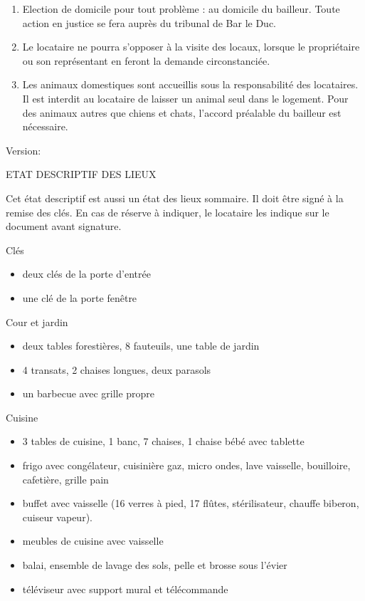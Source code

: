 \documentclass[a4paper,11pt]{article}
\begin{document}
\begin{enumerate}
\item Election de domicile pour tout problème : au domicile du bailleur. Toute action en justice se fera auprès du tribunal de Bar le Duc.

\item Le locataire ne pourra s’opposer à la visite des locaux, lorsque le propriétaire ou son représentant en feront la demande circonstanciée.

\item Les animaux domestiques sont accueillis sous la responsabilité des locataires. Il est interdit au locataire de laisser un animal seul dans le logement. Pour des animaux autres que chiens et chats, l'accord préalable du bailleur est nécessaire.

\end{enumerate}

\hspace{10cm}
Version: \date{\today}


\normalsize

\newpage{}

ETAT DESCRIPTIF DES LIEUX
 
Cet état descriptif est aussi un état des lieux sommaire. Il doit être signé à la remise des clés. En cas de réserve à indiquer, le locataire les indique sur le document avant signature.

\vspace{0.25cm}


Clés
\begin{itemize}
\item deux clés de la porte d'entrée
\item une clé de la porte fenêtre
\end{itemize}


\vspace{0.25cm}

Cour et jardin
\begin{itemize}
\item deux tables forestières, 8 fauteuils, une table de jardin
\item 4 transats, 2 chaises longues, deux parasols
\item un barbecue avec grille propre
\end{itemize}

\vspace{0.25cm}

Cuisine
\begin{itemize}
\item 3 tables de cuisine, 1 banc, 7 chaises, 1 chaise bébé avec tablette
\item frigo avec congélateur, cuisinière gaz, micro ondes, lave vaisselle, bouilloire, cafetière, grille pain
\item buffet avec vaisselle (16 verres à pied, 17 flûtes, stérilisateur, chauffe biberon, cuiseur vapeur).
\item meubles de cuisine avec vaisselle
\item balai, ensemble de lavage des sols, pelle et brosse sous l'évier
\item téléviseur avec support mural et télécommande
\end{itemize}
\end{document}
